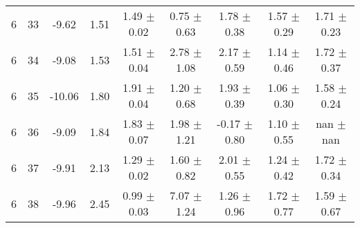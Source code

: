 \begin{landscape}
\begin{longtable}{ccccccccc}
   6 & 33 & -9.62 & 1.51 & 1.49 $\pm$ 0.02 & 0.75 $\pm$ 0.63 & 1.78 $\pm$ 0.38 & 1.57 $\pm$ 0.29 & 1.71 $\pm$ 0.23\\
   6 & 34 & -9.08 & 1.53 & 1.51 $\pm$ 0.04 & 2.78 $\pm$ 1.08 & 2.17 $\pm$ 0.59 & 1.14 $\pm$ 0.46 & 1.72 $\pm$ 0.37\\
   6 & 35 & -10.06 & 1.80 & 1.91 $\pm$ 0.04 & 1.20 $\pm$ 0.68 & 1.93 $\pm$ 0.39 & 1.06 $\pm$ 0.30 & 1.58 $\pm$ 0.24\\
   6 & 36 & -9.09 & 1.84 & 1.83 $\pm$ 0.07 & 1.98 $\pm$ 1.21 & -0.17 $\pm$ 0.80 & 1.10 $\pm$ 0.55 &  nan $\pm$  nan\\
   6 & 37 & -9.91 & 2.13 & 1.29 $\pm$ 0.02 & 1.60 $\pm$ 0.82 & 2.01 $\pm$ 0.55 & 1.24 $\pm$ 0.42 & 1.72 $\pm$ 0.34\\
   6 & 38 & -9.96 & 2.45 & 0.99 $\pm$ 0.03 & 7.07 $\pm$ 1.24 & 1.26 $\pm$ 0.96 & 1.72 $\pm$ 0.77 & 1.59 $\pm$ 0.67
\end{longtable}
\clearpage
\end{landscape}